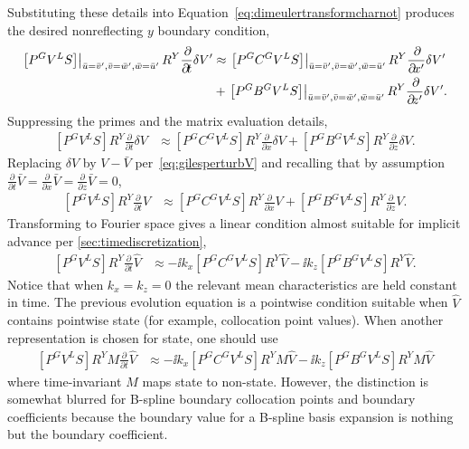 Substituting these details into Equation~\eqref{eq:dimeulertransformcharnot}
produces the desired nonreflecting $y$ boundary condition,
\begin{align}
\label{eq:dimeulertransformcharnotYwieldy}
\left.\left[
  P^G V^L S
\right]\right|_{\bar{u}=\bar{v}', \bar{v}=\bar{w}', \bar{w}=\bar{u}'}
  R^Y
  \frac{\partial\!}{\partial\!t}
  \delta{}V'
&\approx
\left.\left[
  P^G C^G V^L S
\right]\right|_{\bar{u}=\bar{v}', \bar{v}=\bar{w}', \bar{w}=\bar{u}'}
  R^Y
  \frac{\partial\!}{\partial\!x'}
  \delta{}V'
\notag\\&+
\left.\left[
  P^G B^G V^L S
\right]\right|_{\bar{u}=\bar{v}', \bar{v}=\bar{w}', \bar{w}=\bar{u}'}
  R^Y
  \frac{\partial\!}{\partial\!z'}
  \delta{}V'.
\end{align}
Suppressing the primes and the matrix evaluation details,
\begin{align}
\label{eq:dimeulertransformcharnotYphys}
  \left[P^G V^L S\right]
  R^Y
  \frac{\partial\!}{\partial\!t}
  \delta{}V
&\approx
  \left[P^G C^G V^L S\right]
  R^Y
  \frac{\partial\!}{\partial\!x}
  \delta{}V
  +
  \left[P^G B^G V^L S\right]
  R^Y
  \frac{\partial\!}{\partial\!z}
  \delta{}V.
\end{align}
Replacing $\delta{}V$ by $V - \bar{V}$ per~\eqref{eq:gilesperturbV} and
recalling that by assumption
$
    \frac{\partial\!}{\partial\!t} \bar{V}
  = \frac{\partial\!}{\partial\!x} \bar{V}
  = \frac{\partial\!}{\partial\!z} \bar{V}
  = 0
$,
\begin{align}
  \left[P^G V^L S\right]
  R^Y
  \frac{\partial\!}{\partial\!t}
  V
&\approx
  \left[P^G C^G V^L S\right]
  R^Y
  \frac{\partial\!}{\partial\!x}
  V
  +
  \left[P^G B^G V^L S\right]
  R^Y
  \frac{\partial\!}{\partial\!z}
  V.
\end{align}
Transforming to Fourier space gives a linear condition almost suitable for
implicit advance per \autoref{sec:timediscretization},
\begin{align}
  \left[P^G V^L S\right]
  R^Y
  \frac{\partial\!}{\partial\!t}
  \hat{V}
&\approx
  -
  \ii k_x
  \left[P^G C^G V^L S\right]
  R^Y
  \hat{V}
  -
  \ii k_z
  \left[P^G B^G V^L S\right]
  R^Y
  \hat{V}.
\end{align}
Notice that when $k_x=k_z=0$ the relevant mean characteristics are held
constant in time.  The previous evolution equation is a pointwise condition
suitable when $\hat{V}$ contains pointwise state (for example, collocation point
values).  When another representation is chosen for state, one should use
\begin{align}
\label{eq:dimeulertransformcharnotYwave}
  \left[P^G V^L S\right]
  R^Y
  M \frac{\partial\!}{\partial\!t}
  \hat{V}
&\approx
  -
  \ii k_x
  \left[P^G C^G V^L S\right]
  R^Y
  M \hat{V}
  -
  \ii k_z
  \left[P^G B^G V^L S\right]
  R^Y
  M \hat{V}
\end{align}
where time-invariant $M$ maps state to non-state.  However, the distinction is
somewhat blurred for B-spline boundary collocation points and boundary
coefficients because the boundary value for a B-spline basis expansion is
nothing but the boundary coefficient.

